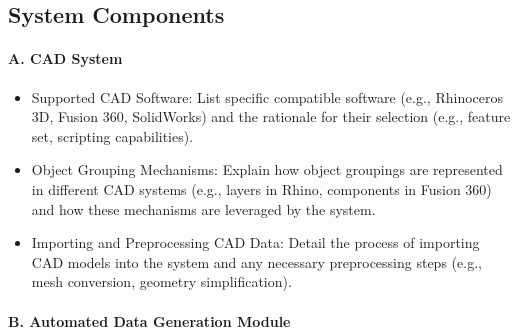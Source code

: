 \documentclass{article}
\begin{document}
\subsection{System Components}
\paragraph{A. CAD System}  
\begin{itemize}
    \item Supported CAD Software:  List specific compatible software (e.g., Rhinoceros 3D, Fusion 360, SolidWorks) and the rationale for their selection (e.g., feature set, scripting capabilities).
    \item Object Grouping Mechanisms: Explain how object groupings are represented in different CAD systems (e.g., layers in Rhino, components in Fusion 360) and how these mechanisms are leveraged by the system.
    \item Importing and Preprocessing CAD Data: Detail the process of importing CAD models into the system and any necessary preprocessing steps (e.g., mesh conversion, geometry simplification).
\end{itemize}
\paragraph{B. Automated Data Generation Module}
\end{document}
